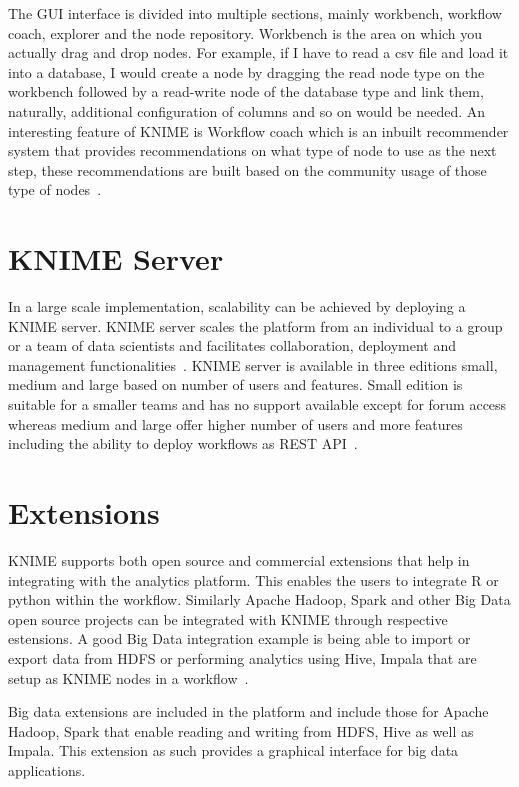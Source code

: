 The GUI interface is divided into multiple sections, mainly workbench,
workflow coach, explorer and the node repository. Workbench is the
area on which you actually drag and drop nodes. For example, if I have
to read a csv file and load it into a database, I would create a node
by dragging the read node type on the workbench followed by a
read-write node of the database type and link them, naturally,
additional configuration of columns and so on would be needed.  An
interesting feature of KNIME is Workflow coach which is an inbuilt
recommender system that provides recommendations on what type of node
to use as the next step, these recommendations are built based on the
community usage of those type of nodes~\cite{hid-sp18-517-ch1sec1}.


\section{KNIME Server}
In a large scale implementation, scalability can be achieved by
deploying a KNIME server. KNIME server scales the platform from an
individual to a group or a team of data scientists and facilitates
collaboration, deployment and management
functionalities~\cite{hid-sp18-517-server}. KNIME server is
available in three editions small, medium and large based on number of
users and features. Small edition is suitable for a smaller teams and
has no support available except for forum access whereas medium and
large offer higher number of users and more features including the
ability to deploy workflows as REST API~\cite{hid-sp18-517-editions}.

\section{Extensions}
KNIME supports both open source and commercial extensions that help 
in integrating with the analytics platform. This enables the users to integrate
R or python within the workflow. Similarly Apache Hadoop, Spark and other 
Big Data open source projects can be integrated with KNIME through respective 
estensions. A good Big Data integration example is being able to import or 
export data from HDFS or performing analytics using Hive, Impala that are
setup as KNIME nodes in a workflow~\cite{hid-sp18-517-ksw}. 

Big data extensions are included in the platform and include those for
Apache Hadoop, Spark that enable reading and writing from HDFS, Hive
as well as Impala. This extension as such provides a graphical
interface for big data applications.

